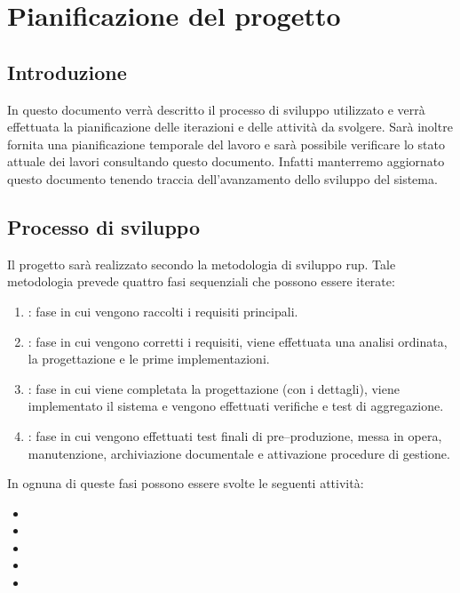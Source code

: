 \chapter{Pianificazione del progetto} 
\label{cha:pianificazione_del_progetto}	

\section{Introduzione}
In questo documento verrà descritto il processo di sviluppo utilizzato e verrà effettuata la pianificazione delle iterazioni e delle attività da svolgere.
Sarà inoltre fornita una pianificazione temporale del lavoro e sarà possibile verificare lo stato attuale dei lavori consultando questo documento. Infatti manterremo aggiornato questo documento tenendo traccia dell'avanzamento dello sviluppo del sistema.

\section{Processo di sviluppo}
\label{sec:processo_di_sviluppo}
Il progetto sarà realizzato secondo la metodologia di sviluppo \gls{rup}.
Tale metodologia prevede quattro fasi sequenziali che possono essere iterate:
\begin{enumerate}
	\item {}: fase in cui vengono raccolti i requisiti principali.

	\item {}: fase in cui vengono corretti i requisiti, viene effettuata una analisi ordinata, la progettazione e le prime implementazioni.

	\item {}: fase in cui viene completata la progettazione (con i dettagli), viene implementato il sistema e vengono effettuati verifiche e test di aggregazione.

	\item {}: fase in cui vengono effettuati test finali di pre--produzione, messa in opera, manutenzione, archiviazione documentale e attivazione procedure di gestione.
\end{enumerate}

\noindent
In ognuna di queste fasi possono essere svolte le seguenti attività:
\begin{itemize}
	\item {}
	\item {}
	\item {}
	\item {}
	\item {}
\end{itemize}


